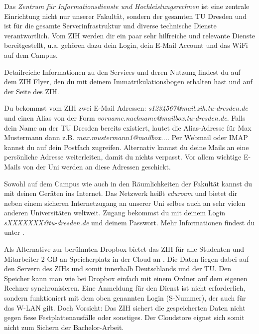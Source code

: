 

Das \textit{Zentrum für Informationsdienste und Hochleistungsrechnen} ist eine zentrale Einrichtung nicht nur unserer Fakultät, sondern der gesamten TU Dresden und ist für die gesamte Serverinfrastruktur und diverse technische Dienste verantwortlich. Vom ZIH werden dir ein paar sehr hilfreiche und relevante Dienste bereitgestellt, u.a. gehören dazu dein Login, dein E-Mail Account und das WiFi auf dem Campus.

Detailreiche Informationen zu den Services und deren Nutzung findest du auf dem ZIH Flyer, den du mit deinem Immatrikulationsbogen erhalten hast und auf der Seite des ZIH.

Du bekommst vom ZIH zwei E-Mail Adressen:
\textit{s1234567@mail.zih.tu-dresden.de} und einen Alias von der Form \textit{vorname.nachname@mailbox.tu-dresden.de}.
Falls dein Name an der TU Dresden bereits existiert, lautet die Alias-Adresse für Max Mustermann dann z.B. \textit{max.mustermann1@mailbox...}.
Per Webmail oder IMAP kannst du auf dein Postfach zugreifen.
Alternativ kannst du deine Mails an eine persönliche Adresse weiterleiten, damit du nichts verpasst.
Vor allem wichtige E-Mails von der Uni werden an diese Adressen geschickt.

Sowohl auf dem Campus wie auch in den Räumlichkeiten der Fakultät kannst du mit deinen Geräten ins Internet.
Das Netzwerk heißt \textit{eduroam} und bietet dir neben einem sicheren Internetzugang an unserer Uni selbes auch an sehr vielen anderen Universitäten weltweit. 
Zugang bekommst du mit deinem Login \textit{sXXXXXXX@tu-dresden.de} und deinem Passwort. Mehr Informationen findest du unter .

Als Alternative zur berühmten Dropbox bietet das ZIH für alle Studenten und Mitarbeiter 2 GB an Speicherplatz in der Cloud an . Die Daten liegen dabei auf den Servern des ZIHs und somit innerhalb Deutschlands und der TU. Den Speicher kann man wie bei Dropbox einfach mit einem Ordner auf dem eigenen Rechner synchronisieren. Eine Anmeldung für den Dienst ist nicht erforderlich, sondern funktioniert mit dem oben genannten Login (S-Nummer), der auch für das W-LAN gilt.
Doch Vorsicht: Das ZIH sichert die gespeicherten Daten nicht gegen fiese Festplattenausfälle oder sonstiges. Der Cloudstore eignet sich somit nicht zum Sichern der Bachelor-Arbeit. 

